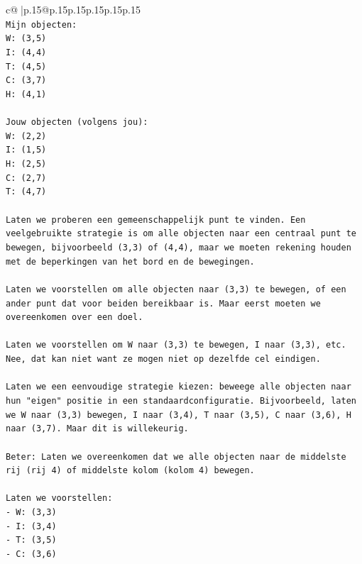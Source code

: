 \documentclass{article}
\begin{document}
{\begin{supertabular}{c@{$\;$}|p{.15\linewidth}@{}p{.15\linewidth}p{.15\linewidth}p{.15\linewidth}p{.15\linewidth}p{.15\linewidth}}
{{{\\ 
\texttt{Mijn objecten:} \\
\texttt{W: (3,5)} \\
\texttt{I: (4,4)} \\
\texttt{T: (4,5)} \\
\texttt{C: (3,7)} \\
\texttt{H: (4,1)} \\
\\ 
\texttt{Jouw objecten (volgens jou):} \\
\texttt{W: (2,2)} \\
\texttt{I: (1,5)} \\
\texttt{H: (2,5)} \\
\texttt{C: (2,7)} \\
\texttt{T: (4,7)} \\
\\ 
\texttt{Laten we proberen een gemeenschappelijk punt te vinden. Een veelgebruikte strategie is om alle objecten naar een centraal punt te bewegen, bijvoorbeeld (3,3) of (4,4), maar we moeten rekening houden met de beperkingen van het bord en de bewegingen.} \\
\\ 
\texttt{Laten we voorstellen om alle objecten naar (3,3) te bewegen, of een ander punt dat voor beiden bereikbaar is. Maar eerst moeten we overeenkomen over een doel.} \\
\\ 
\texttt{Laten we voorstellen om W naar (3,3) te bewegen, I naar (3,3), etc. Nee, dat kan niet want ze mogen niet op dezelfde cel eindigen.} \\
\\ 
\texttt{Laten we een eenvoudige strategie kiezen: beweege alle objecten naar hun "eigen" positie in een standaardconfiguratie. Bijvoorbeeld, laten we W naar (3,3) bewegen, I naar (3,4), T naar (3,5), C naar (3,6), H naar (3,7). Maar dit is willekeurig.} \\
\\ 
\texttt{Beter: Laten we overeenkomen dat we alle objecten naar de middelste rij (rij 4) of middelste kolom (kolom 4) bewegen.} \\
\\ 
\texttt{Laten we voorstellen:} \\
\texttt{{-} W: (3,3)} \\
\texttt{{-} I: (3,4)} \\
\texttt{{-} T: (3,5)} \\
\texttt{{-} C: (3,6)} \\
}}}
\end{supertabular}}
\end{document}
